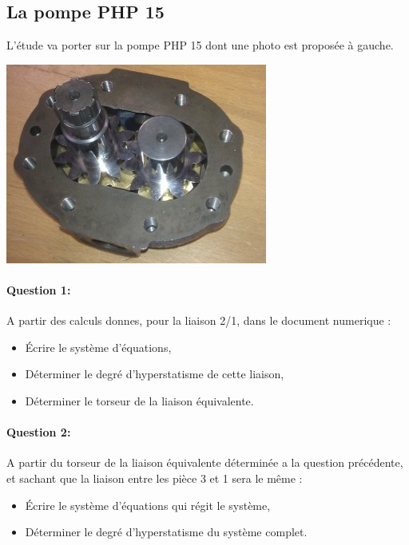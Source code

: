 \subsection{La pompe PHP 15}

\begin{minipage}{0.6\linewidth}
L'étude va porter sur la pompe PHP 15 dont une photo est proposée à gauche.
\end{minipage}
\hfill
\begin{minipage}{0.35\linewidth}
 \centering\includegraphics[width=0.8\linewidth]{img/PHP15}
\end{minipage}

\paragraph{Question 1:} A partir des calculs donnes, pour la liaison 2/1, dans le document numerique :
\begin{itemize}
 \item Écrire le système d'équations,
 \item Déterminer le degré d'hyperstatisme de cette liaison,
 \item Déterminer le torseur de la liaison équivalente.
\end{itemize}

\reponse[5]

\paragraph{Question 2:} A partir du torseur de la liaison équivalente déterminée a la question précédente, et
sachant que la liaison entre les pièce 3 et 1 sera le même :
\begin{itemize}
\item Écrire le système d'équations qui régit le système,
\item Déterminer le degré d'hyperstatisme du système complet.
\end{itemize}


